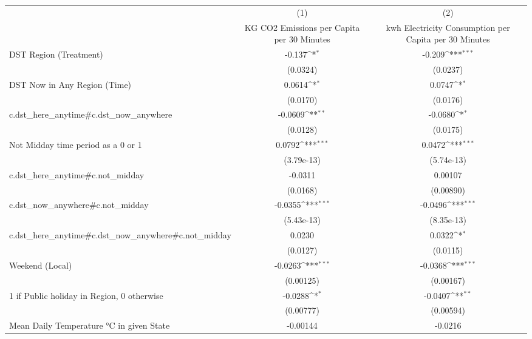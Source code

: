 {
\def\sym#1{\ifmmode^{#1}\else\(^{#1}\)\fi}
\begin{tabular}{l*{2}{c}}
\hline\hline
                    &\multicolumn{1}{c}{(1)}&\multicolumn{1}{c}{(2)}\\
                    &\multicolumn{1}{c}{KG CO2 Emissions per Capita per 30 Minutes}&\multicolumn{1}{c}{kwh Electricity Consumption per Capita per 30 Minutes}\\
\hline
DST Region (Treatment)&      -0.137\sym{*}  &      -0.209\sym{***}\\
                    &    (0.0324)         &    (0.0237)         \\
[1em]
DST Now in Any Region (Time)&      0.0614\sym{*}  &      0.0747\sym{*}  \\
                    &    (0.0170)         &    (0.0176)         \\
[1em]
c.dst\_here\_anytime#c.dst\_now\_anywhere&     -0.0609\sym{**} &     -0.0680\sym{*}  \\
                    &    (0.0128)         &    (0.0175)         \\
[1em]
Not Midday time period as a 0 or 1&      0.0792\sym{***}&      0.0472\sym{***}\\
                    &  (3.79e-13)         &  (5.74e-13)         \\
[1em]
c.dst\_here\_anytime#c.not\_midday&     -0.0311         &     0.00107         \\
                    &    (0.0168)         &   (0.00890)         \\
[1em]
c.dst\_now\_anywhere#c.not\_midday&     -0.0355\sym{***}&     -0.0496\sym{***}\\
                    &  (5.43e-13)         &  (8.35e-13)         \\
[1em]
c.dst\_here\_anytime#c.dst\_now\_anywhere#c.not\_midday&      0.0230         &      0.0322\sym{*}  \\
                    &    (0.0127)         &    (0.0115)         \\
[1em]
Weekend (Local)     &     -0.0263\sym{***}&     -0.0368\sym{***}\\
                    &   (0.00125)         &   (0.00167)         \\
[1em]
1 if Public holiday in Region, 0 otherwise&     -0.0288\sym{*}  &     -0.0407\sym{**} \\
                    &   (0.00777)         &   (0.00594)         \\
[1em]
Mean Daily Temperature °C in given State&    -0.00144         &     -0.0216         \\

\end{tabular}}
